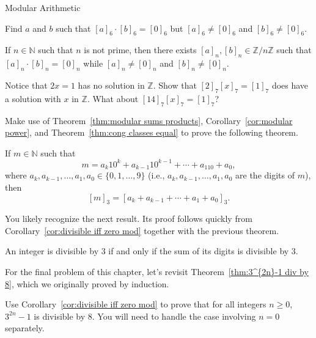 \begin{section}{Modular Arithmetic}
\begin{problem}
Find $a$ and $b$ such that $[a]_6\cdot[b]_6 = [0]_6$ but $[a]_6 \neq [0]_6$ and $[b]_6 \neq [0]_6$. %
\end{problem}

\begin{theorem}
If $n\in \mathbb{N}$ such that $n$ is not prime, then there exists $[a]_n, [b]_n \in \mathbb{Z}/n\mathbb{Z}$ such that $[a]_n\cdot[b]_n = [0]_n$ while $[a]_n \neq [0]_n$ and $[b]_n \neq [0]_n$.
\end{theorem}

\begin{problem}
Notice that $2x = 1$ has no solution in $\mathbb{Z}$. Show that $[2]_7[x]_7 = [1]_7$ does have a solution with $x$ in $\mathbb{Z}$. What about $[14]_7[x]_7 = [1]_7$?
\end{problem}

Make use of Theorem~\ref{thm:modular sums products}, Corollary~\ref{cor:modular power}, and Theorem~\ref{thm:cong classes equal} to prove the following theorem.

\begin{theorem}
If $m\in \mathbb{N}$ such that
\[
m=a_k10^k + a_{k-1}10^{k-1} + \cdots + a_110 + a_0,
\]
where $a_k, a_{k-1}, \ldots, a_1, a_0\in \{0,1,\ldots, 9\}$ (i.e., $a_k, a_{k-1}, \ldots, a_1, a_0$ are the digits of $m$), then
\[
[m]_3 =  [a_k + a_{k-1} + \cdots + a_1 + a_0]_3.
\]
\end{theorem}

You likely recognize the next result. Its proof follows quickly from Corollary~\ref{cor:divisible iff zero mod} together with the previous theorem.

\begin{theorem}
An integer is divisible by $3$ if and only if the sum of its digits is divisible by $3$.
\end{theorem}

For the final problem of this chapter, let's revisit Theorem~\ref{thm:3^{2n}-1 div by 8}, which we originally proved by induction.

\begin{problem}
Use Corollary~\ref{cor:divisible iff zero mod} to prove that for all integers $n \ge 0$, $3^{2n}-1$ is divisible by $8$. You will need to handle the case involving $n=0$ separately.
\end{problem}

\end{section}
